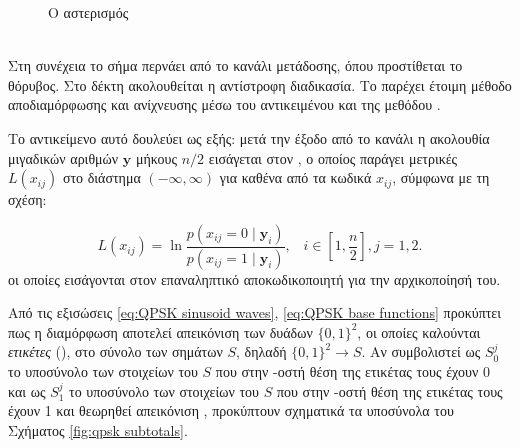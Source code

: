 \begin{figure}[H]
\caption{Ο αστερισμός }
\label{fig:qpsk constellation}
\end{figure}
\hfill\\

Στη συνέχεια το σήμα περνάει από το κανάλι μετάδοσης, όπου προστίθεται το  θόρυβος. Στο δέκτη ακολουθείται η αντίστροφη διαδικασία. Το  παρέχει έτοιμη μέθοδο αποδιαμόρφωσης και ανίχνευσης μέσω του αντικειμένου  και της μεθόδου .

Το αντικείμενο αυτό δουλεύει ως εξής: μετά την έξοδο από το κανάλι η ακολουθία μιγαδικών αριθμών $\mathbf{y}$ μήκους $n/2$ εισάγεται στον , ο οποίος παράγει μετρικές $L(x_{ij})$ στο διάστημα $(-\infty,\infty)$ για καθένα από τα κωδικά  $x_{ij}$, σύμφωνα με τη σχέση:

\begin{equation}
L(x_{ij})=\ln\frac{p(x_{ij}=0\mid\mathbf{y}_i)}{p(x_{ij}=1\mid\mathbf{y}_i)},\;\;\;i\in\left[1,\frac{n}{2}\right],j=1,2.
\label{eq:QPSK LLR}
\end{equation}
οι οποίες εισάγονται στον επαναληπτικό αποκωδικοποιητή για την αρχικοποίησή του.

Από τις εξισώσεις \ref{eq:QPSK sinusoid waves}, \ref{eq:QPSK base functions} προκύπτει πως η διαμόρφωση  αποτελεί απεικόνιση των δυάδων $\{0,1\}^2$, οι οποίες καλούνται \textit{ετικέτες} (), στο σύνολο των  σημάτων $S$, δηλαδή $\{0,1\}^2\to{S}$. Αν συμβολιστεί ως ${S}_0^j$  το υποσύνολο των στοιχείων του $S$ που στην -οστή θέση της ετικέτας τους έχουν 0 και ως ${S}_1^j$ το υποσύνολο των στοιχείων του $S$ που στην -οστή θέση της ετικέτας τους έχουν 1 και θεωρηθεί απεικόνιση , προκύπτουν σχηματικά τα υποσύνολα του Σχήματος \ref{fig:qpsk subtotals}.

